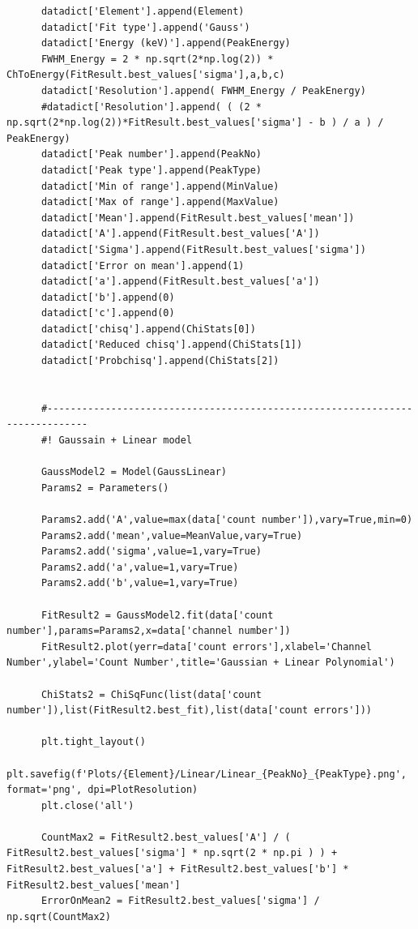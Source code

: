 \documentclass[11pt,a4paper]{article}
\begin{document}
\begin{verbatim}
      datadict['Element'].append(Element)
      datadict['Fit type'].append('Gauss')
      datadict['Energy (keV)'].append(PeakEnergy)
      FWHM_Energy = 2 * np.sqrt(2*np.log(2)) * ChToEnergy(FitResult.best_values['sigma'],a,b,c)
      datadict['Resolution'].append( FWHM_Energy / PeakEnergy)
      #datadict['Resolution'].append( ( (2 * np.sqrt(2*np.log(2))*FitResult.best_values['sigma'] - b ) / a ) / PeakEnergy)
      datadict['Peak number'].append(PeakNo)
      datadict['Peak type'].append(PeakType)
      datadict['Min of range'].append(MinValue)
      datadict['Max of range'].append(MaxValue)
      datadict['Mean'].append(FitResult.best_values['mean'])
      datadict['A'].append(FitResult.best_values['A'])
      datadict['Sigma'].append(FitResult.best_values['sigma'])
      datadict['Error on mean'].append(1)
      datadict['a'].append(FitResult.best_values['a'])
      datadict['b'].append(0)
      datadict['c'].append(0)
      datadict['chisq'].append(ChiStats[0])
      datadict['Reduced chisq'].append(ChiStats[1])
      datadict['Probchisq'].append(ChiStats[2])

      
      #-----------------------------------------------------------------------------
      #! Gaussain + Linear model 

      GaussModel2 = Model(GaussLinear)
      Params2 = Parameters()

      Params2.add('A',value=max(data['count number']),vary=True,min=0)
      Params2.add('mean',value=MeanValue,vary=True)
      Params2.add('sigma',value=1,vary=True)
      Params2.add('a',value=1,vary=True)
      Params2.add('b',value=1,vary=True)

      FitResult2 = GaussModel2.fit(data['count number'],params=Params2,x=data['channel number'])
      FitResult2.plot(yerr=data['count errors'],xlabel='Channel Number',ylabel='Count Number',title='Gaussian + Linear Polynomial')

      ChiStats2 = ChiSqFunc(list(data['count number']),list(FitResult2.best_fit),list(data['count errors']))

      plt.tight_layout()
      plt.savefig(f'Plots/{Element}/Linear/Linear_{PeakNo}_{PeakType}.png', format='png', dpi=PlotResolution)
      plt.close('all')

      CountMax2 = FitResult2.best_values['A'] / ( FitResult2.best_values['sigma'] * np.sqrt(2 * np.pi ) ) + FitResult2.best_values['a'] + FitResult2.best_values['b'] * FitResult2.best_values['mean']
      ErrorOnMean2 = FitResult2.best_values['sigma'] / np.sqrt(CountMax2)
      

\end{verbatim}
\end{document}

